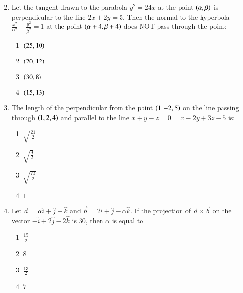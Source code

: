 \documentclass[journal]{IEEEtran}
\begin{document}
\begin{enumerate}
\begin{multicols}{2}
\begin{enumerate}
            \end{enumerate}
        \end{multicols}
        \item Let the tangent drawn to the parabola $y^2 = 24x$ at the point $\left(\alpha,\beta\right)$ is perpendicular to the line $2x+2y = 5$. Then the normal to the hyperbola $\frac{x^2}{\alpha^2} - \frac{y^2}{\beta^2} = 1$ at the point $\left(\alpha+4,\beta+4\right)$ does NOT pass through the point:
        \begin{multicols}{2}
            \begin{enumerate}
                \item $\left(25,10\right)$
                \item $\left(20,12\right)$
                \item $\left(30,8\right)$
                \item $\left(15,13\right)$
            \end{enumerate}
        \end{multicols}
        \item The length of the perpendicular from the point $\left(1,-2,5\right)$ on the line passing through $\left(1,2,4\right)$ and parallel to the line $x+y-z = 0 = x-2y+3z-5$ is:
        \begin{multicols}{2}
            \begin{enumerate}
                \item $\sqrt{\frac{21}{2}}$
                \item $\sqrt{\frac{9}{2}}$
                \item $\sqrt{\frac{73}{2}}$
                \item $1$
            \end{enumerate}
        \end{multicols}
       \item  Let $\vec{a}=\alpha \hat{i} + \hat{j} - \hat{k}$ and $\vec{b} = 2\hat{i}+\hat{j}-\alpha\hat{k}$. If the projection of $\vec{a} \times \vec{b}$ on the vector $-\hat{i}+2\hat{j}-2\hat{k}$ is 30, then $\alpha$ is equal to
       \begin{multicols}{2}
           \begin{enumerate}
               \item $\frac{15}{2}$
               \item 8
               \item $\frac{13}{2}$
               \item $7$
           \end{enumerate}
       \end{multicols}
    
\end{enumerate}
\end{document}
